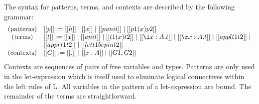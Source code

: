 \documentclass{article}
\begin{document}
The syntax for patterns, terms, and contexts are described by the
following grammar:
\[
\begin{array}{cll}
  \text{(patterns)} & [[p]] := [[h]] \mid [[x]] \mid [[punit]] \mid [[p1 (x) p2]]\\
  \text{(terms)}    & [[t]] := [[x]] \mid [[unit]] \mid [[t1 (x) t2]] \mid [[\l x : A.t]] \mid [[\r x : A.t]] \mid
  [[appl t1 t2]] \mid \\ & [[appr t1 t2]] \mid [[let t1 be p in t2]]\\
  \text{(contexts)} & [[G]] := [[.]] \mid [[x : A]] \mid [[G1,G2]]\\
\end{array}
\]
Contexts are sequences of pairs of free variables and types.  Patterns
are only used in the let-expression which is itself used to eliminate
logical connectives within the left rules of L.  All variables in the
pattern of a let-expression are bound.  The remainder of the terms are
straightforward.
\end{document}
